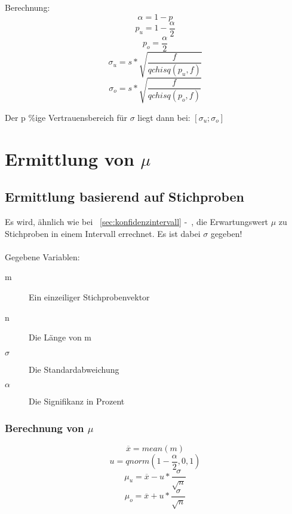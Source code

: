 \documentclass[a4paper,10pt]{article}
\begin{document}
Berechnung:
\begin{equation}
  \alpha = 1 - p
\end{equation}
\begin{equation}
  p_u = 1 - \frac{\alpha}{2}
\end{equation}
\begin{equation}
  p_o = \frac{\alpha}{2}
\end{equation}
\begin{equation}
  \sigma_u = s * \sqrt{\frac{f}{qchisq(p_u , f)}}
\end{equation}
\begin{equation}
  \sigma_o = s * \sqrt{\frac{f}{qchisq(p_o , f)}}
\end{equation}

Der p \%ige Vertrauensbereich für $
\sigma $ liegt dann bei: $ [
\sigma_u ; \sigma_o] $

\section{Ermittlung von $ \mu $}
\subsection{Ermittlung basierend auf Stichproben}
\label{sec:ermittlungvonmuermittlungbasierendaufeinergrundmenge}
Es wird, ähnlich wie bei ~\autoref{sec:konfidenzintervall}
-~, die Erwartungswert $ \mu $ zu Stichproben in
einem Intervall errechnet. Es ist dabei $ \sigma $ gegeben!
\\\\
Gegebene Variablen:
\begin{description}
\item[m] Ein einzeiliger Stichprobenvektor
\item[n] Die Länge von m
\item[$ \sigma $] Die Standardabweichung
\item[$ \alpha $] Die Signifikanz in Prozent
\end{description}

\subsubsection{Berechnung von $ \mu $}
\begin{equation}
  \overline{x} = mean(m)
\end{equation}
\begin{equation}
  u = qnorm(1 - \frac{\alpha}{2}, 0, 1)
\end{equation}
\begin{equation}
  \mu_u = \overline{x} - u * \frac{\sigma}{\sqrt{n}}
\end{equation}
\begin{equation}
  \mu_o = \overline{x} + u * \frac{\sigma}{\sqrt{n}}
\end{equation}
\end{document}
